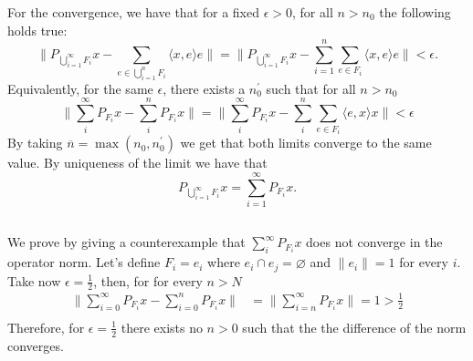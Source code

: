 \documentclass[a4paper,12pt]{article} %
\begin{document}
For the convergence, we have that for a fixed \(\epsilon >0\), for all \(n>n_0\) the following holds true:
\begin{equation}
    \| P_{\bigcup_{i=1}^{\infty}F_i}x - \sum_{e \in  \bigcup_{i=1}^{n} F_i} \langle x,e \rangle  e  \|  = \| P_{\bigcup_{i=1}^{\infty}F_i}x - \sum_{ i=1}^n \sum_{e \in  F_i}\langle x,e \rangle e   \| < \epsilon.
\end{equation}
Equivalently, for the same \(\epsilon \), there exists a \(n_0^{\prime} \)  such that for all \(n>n_0\)
\begin{equation}
    \| \sum_{i} ^{\infty} P_{F_i}x - \sum_{i}^n P_{F_i}x  \| =      \| \sum_{i} ^{\infty} P_{F_i}x - \sum_{i}^n \sum_{e \in  F_i}\langle e,x \rangle x   \| < \epsilon
\end{equation}
By taking \(\overline{n} = \max (n_0, n_{0}^{\prime} )\) we get
that both limits converge to the same value. By uniqueness of the limit we have that
\begin{equation}
    P_{\bigcup_{i=1}^{\infty} F_i} x = \sum_{i=1}^{\infty} P_{F_i} x.
\end{equation}


\subsection{}
We prove by giving a counterexample that \(\sum_{i}^{\infty}  P_{F_i}x \) does not converge in the operator norm.
Let's define \(F_i= e_i\) where \(e_i \cap  e_j  = \varnothing \) and \(\| e_i \| = 1 \) for every \(i\).
Take now \(\epsilon =\frac{1}{2}\), then, for for every \(n>N\)
\begin{align*}
    \| \sum_{i=0}^{\infty} P_{F_i}x - \sum_{i=0}^n P_{F_i}x \| & = \| \sum_
    {i=n}^{\infty}  P_{F_i}x \| = 1 >\frac{1}{2}                            \\
\end{align*}
Therefore, for \(\epsilon =\frac{1}{2}\) there exists no \(n>0\) such that the the difference of the norm converges.
\end{document}
